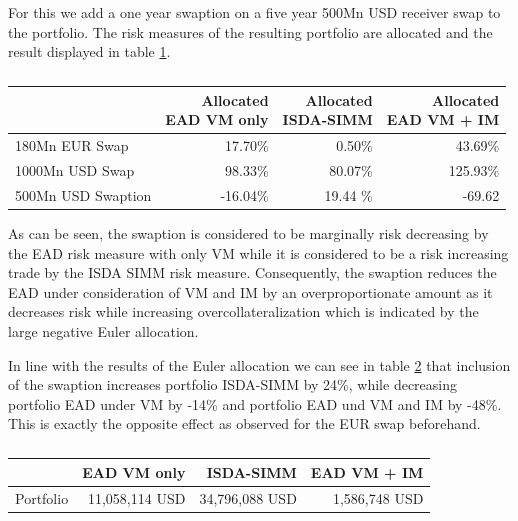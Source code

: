 \documentclass[../Thesis_AHoecherl.tex]{subfiles}
\begin{document}
    For this we add a one year swaption on a five year 500Mn USD receiver swap to the portfolio. The risk measures of the resulting portfolio are allocated and the result displayed in table \ref{tab:3TradeRatesAllocation}.
    \begin{table}[htbp]
        \centering
        \begin{tabular}{l||r|r|r}
                & \makecell{Allocated \\ EAD VM only} &\makecell{Allocated \\ ISDA-SIMM} &\makecell{Allocated \\ EAD VM + IM} \\
                \toprule
        180Mn EUR Swap & 17.70\% & 0.50\% & 43.69\% \\
        1000Mn USD Swap & 98.33\% & 80.07\% & 125.93\% \\
        500Mn USD Swaption & -16.04\% & 19.44 \% & -69.62\\
        \end{tabular}%
        \caption{}
        \label{tab:3TradeRatesAllocation}%
    \end{table}%
    As can be seen, the swaption is considered to be marginally risk decreasing by the EAD risk measure with only VM while it is considered to be a risk increasing trade by the ISDA SIMM risk measure. Consequently, the swaption reduces the EAD under consideration of VM and IM by an overproportionate amount as it decreases risk while increasing overcollateralization which is indicated by the large negative Euler allocation.

    In line with the results of the Euler allocation we can see in table \ref{tab:3TradeRatesResults} that inclusion of the swaption increases portfolio ISDA-SIMM by 24\%, while decreasing portfolio EAD under VM by -14\% and portfolio EAD und VM and IM by -48\%. This is exactly the opposite effect as observed for the EUR swap beforehand.

    \begin{table}[htbp]
        \centering
        \begin{tabular}{l||r|r|r}
                & EAD VM only &ISDA-SIMM & EAD VM + IM \\
                \toprule
        Portfolio & 11,058,114 USD & 34,796,088 USD & 1,586,748 USD \\
        \end{tabular}%
        \caption{}
        \label{tab:3TradeRatesResults}%
    \end{table}%
\end{document}
